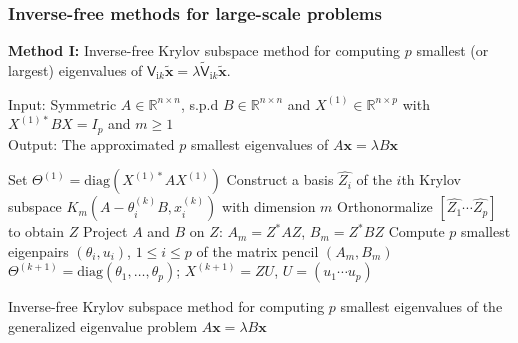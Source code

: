 \documentclass[dvipsnames,10pt]{beamer}
\begin{document}
\begin{frame}
    \frametitle{Inverse-free methods for large-scale problems}
    \vspace{0.3cm}
\textbf{Method I:} Inverse-free Krylov subspace method for computing $p$ smallest (or largest) eigenvalues of  $\mathsf{V}_{\mathrm{i}k}\tilde{\boldsymbol{x}} = \lambda \tilde{\mathsf{V}}_{\mathrm{i}k}\tilde{\boldsymbol{x}}$.
\begin{tcolorbox}
    \begin{algorithm}
    \SetAlgoLined
    Input: Symmetric  $A\in\mathbb{R}^{n\times n}$, s.p.d  $B\in\mathbb{R}^{n\times n}$ and
    $X^{(1)} \in\mathbb{R}^{n\times p}$ with $X^{(1)*}BX = I_{p}$ and $m\geq 1$\\
    Output: The approximated $p$ smallest eigenvalues of $A\boldsymbol{x} = \lambda B\boldsymbol{x}$\\
    \begin{algorithmic}[1]
        \STATE Set $\Theta^{(1)} = \text{diag}(X^{(1)*}AX^{(1)})$
                    \STATE Construct a basis $\hat{Z_{i}}$ of the $i$th Krylov subspace $K_{m}(A - \theta_{i}^{(k)}B, x_{i}^{(k)})$ with dimension $m$
                    \STATE Orthonormalize $\left[\hat{Z_{1}} \cdots \hat{Z_{p}}\right]$ to obtain $Z$
                    \STATE Project $A$ and $B$ on $Z$: $A_{m} = Z^{*}AZ$, $B_{m} = Z^{*}BZ$
                    \STATE Compute $p$ smallest eigenpairs $(\theta_{i}, u_{i})$, $1\leq i \leq p$ of the matrix pencil $(A_{m}, B_{m})$
                    \STATE $\Theta^{(k+1)} = \text{diag}(\theta_{1}, \dots, \theta_{p})$; $X^{(k+1)} = ZU$, $U = (u_{1} \cdots u_{p})$
                \ENDFOR
        \ENDFOR
        \end{algorithmic}
    \caption{Inverse-free Krylov subspace method for computing $p$ smallest eigenvalues of the generalized eigenvalue problem $A\boldsymbol{x} = \lambda B\boldsymbol{x}$}
    \label{Alg for computing the evals}
    \end{algorithm}
\end{tcolorbox}

\end{frame}
\end{document}
